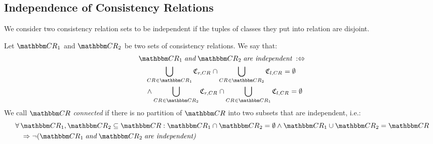 \subsection{Independence of Consistency Relations}
\label{chap:compatibility:formal_approach:independence}

We consider two consistency relation sets to be independent if the tuples of classes they put into relation are disjoint.

\begin{definition}
    \label{def:independence}
    Let $\consistencyrelationset{CR}_{1}$ and $\consistencyrelationset{CR}_{2}$ be two sets of consistency relations. We say that:
    \begin{align*}
        &
        \consistencyrelationset{CR}_{1} \andmath \consistencyrelationset{CR}_{2} \mathtextspacearound{are independent} \equivalentperdefinition \\
        & \formulaskip
        \bigcup_{\consistencyrelation{CR}{} \in \consistencyrelationset{CR}_1} \classtuple{C}{r,\consistencyrelation{CR}{}} \cap \bigcup_{\consistencyrelation{CR}{} \in \consistencyrelationset{CR}_2} \classtuple{C}{l,\consistencyrelation{CR}{}} = \emptyset \\
        & \formulaskip
        \land 
        \bigcup_{\consistencyrelation{CR}{} \in \consistencyrelationset{CR}_2} \classtuple{C}{r,\consistencyrelation{CR}{}} \cap \bigcup_{\consistencyrelation{CR}{} \in \consistencyrelationset{CR}_1} \classtuple{C}{l,\consistencyrelation{CR}{}} = \emptyset
    \end{align*}
    We call $\consistencyrelationset{CR}$ \emph{connected} if there is no partition of $\consistencyrelationset{CR}$ into two subsets that are independent, i.e.:
    \begin{align*}
        &
        \forall \consistencyrelationset{CR}_{1}, \consistencyrelationset{CR}_{2} \subseteq \consistencyrelationset{CR} : %
        \consistencyrelationset{CR}_{1} \cap \consistencyrelationset{CR}_{2} = \emptyset \land \consistencyrelationset{CR}_{1} \cup \consistencyrelationset{CR}_{2} = \consistencyrelationset{CR}  \\
        & \formulaskip%
        \Rightarrow \neg (\consistencyrelationset{CR}_{1} \andmath \consistencyrelationset{CR}_{2} \mathtextspacearound{are independent)}
    \end{align*}
\end{definition}

